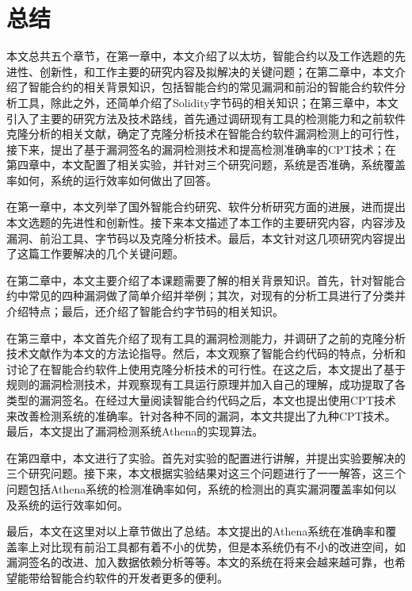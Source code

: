 \chapter{总结}

本文总共五个章节，在第一章中，本文介绍了以太坊，智能合约以及工作选题的先进性、创新性，和工作主要的研究内容及拟解决的关键问题；在第二章中，本文介绍了智能合约的相关背景知识，包括智能合约的常见漏洞和前沿的智能合约软件分析工具，除此之外，还简单介绍了Solidity字节码的相关知识；在第三章中，本文引入了主要的研究方法及技术路线，首先通过调研现有工具的检测能力和之前软件克隆分析的相关文献，确定了克隆分析技术在智能合约软件漏洞检测上的可行性，接下来，提出了基于漏洞签名的漏洞检测技术和提高检测准确率的CPT技术；在第四章中，本文配置了相关实验，并针对三个研究问题，系统是否准确，系统覆盖率如何，系统的运行效率如何做出了回答。

在第一章中，本文列举了国外智能合约研究、软件分析研究方面的进展，进而提出本文选题的先进性和创新性。接下来本文描述了本工作的主要研究内容，内容涉及漏洞、前沿工具、字节码以及克隆分析技术。最后，本文针对这几项研究内容提出了这篇工作要解决的几个关键问题。

在第二章中，本文主要介绍了本课题需要了解的相关背景知识。首先，针对智能合约中常见的四种漏洞做了简单介绍并举例；其次，对现有的分析工具进行了分类并介绍特点；最后，还介绍了智能合约字节码的相关知识。

在第三章中，本文首先介绍了现有工具的漏洞检测能力，并调研了之前的克隆分析技术文献作为本文的方法论指导。然后，本文观察了智能合约代码的特点，分析和讨论了在智能合约软件上使用克隆分析技术的可行性。在这之后，本文提出了基于规则的漏洞检测技术，并观察现有工具运行原理并加入自己的理解，成功提取了各类型的漏洞签名。在经过大量阅读智能合约代码之后，本文也提出使用CPT技术来改善检测系统的准确率。针对各种不同的漏洞，本文共提出了九种CPT技术。最后，本文提出了漏洞检测系统Athena的实现算法。

在第四章中，本文进行了实验。首先对实验的配置进行讲解，并提出实验要解决的三个研究问题。接下来，本文根据实验结果对这三个问题进行了一一解答，这三个问题包括Athena系统的检测准确率如何，系统的检测出的真实漏洞覆盖率如何以及系统的运行效率如何。

最后，本文在这里对以上章节做出了总结。本文提出的Athena系统在准确率和覆盖率上对比现有前沿工具都有着不小的优势，但是本系统仍有不小的改进空间，如漏洞签名的改进、加入数据依赖分析等等。本文的系统在将来会越来越可靠，也希望能带给智能合约软件的开发者更多的便利。
